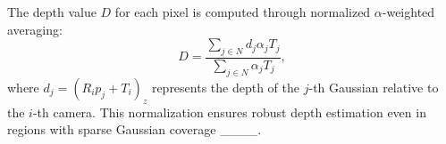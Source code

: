 The depth value \( D \) for each pixel is computed through normalized \(\alpha\)-weighted averaging:
\begin{equation}
D = \frac{\sum_{j \in N} d_j \alpha_j T_j}{\sum_{j \in N} \alpha_j T_j},
\end{equation}
where \( d_j = (R_i p_j + T_i)_z \) represents the depth of the \( j \)-th Gaussian relative to the \( i \)-th camera. This normalization ensures robust depth estimation even in regions with sparse Gaussian coverage ____.
